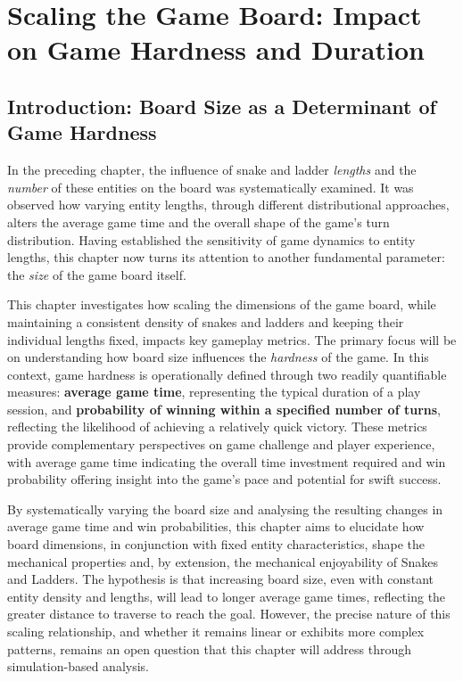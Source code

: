 \chapter{Scaling the Game Board: Impact on Game Hardness and Duration}

\section{Introduction: Board Size as a Determinant of Game Hardness}

In the preceding chapter, the influence of snake and ladder \textit{lengths} and the \textit{number} of these entities on the board was systematically examined. It was observed how varying entity lengths, through different distributional approaches, alters the average game time and the overall shape of the game's turn distribution.  Having established the sensitivity of game dynamics to entity lengths, this chapter now turns its attention to another fundamental parameter: the \textit{size} of the game board itself. 

This chapter investigates how scaling the dimensions of the game board, while maintaining a consistent density of snakes and ladders and keeping their individual lengths fixed, impacts key gameplay metrics.  The primary focus will be on understanding how board size influences the \textit{hardness} of the game. In this context, game hardness is operationally defined through two readily quantifiable measures: \textbf{average game time}, representing the typical duration of a play session, and \textbf{probability of winning within a specified number of turns}, reflecting the likelihood of achieving a relatively quick victory.  These metrics provide complementary perspectives on game challenge and player experience, with average game time indicating the overall time investment required and win probability offering insight into the game's pace and potential for swift success.

By systematically varying the board size and analysing the resulting changes in average game time and win probabilities, this chapter aims to elucidate how board dimensions, in conjunction with fixed entity characteristics, shape the mechanical properties and, by extension, the mechanical enjoyability of Snakes and Ladders.  The hypothesis is that increasing board size, even with constant entity density and lengths, will lead to longer average game times, reflecting the greater distance to traverse to reach the goal. However, the precise nature of this scaling relationship, and whether it remains linear or exhibits more complex patterns, remains an open question that this chapter will address through simulation-based analysis.


